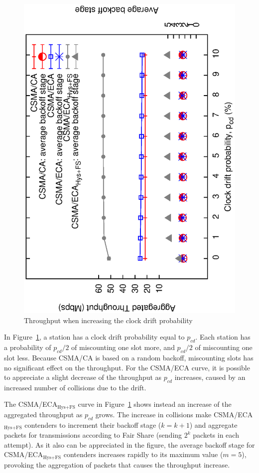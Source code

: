 \documentclass[a4paper,journal]{IEEEtran}
\begin{document}
	\begin{figure}[htbp]
	\centering
		\includegraphics[width=0.7\linewidth,angle=-90]{figures/clockDrift/throughput_and_BOS_w_SD.eps}
		\caption{Throughput when increasing the clock drift probability}
		\label{fig:clockDrift}
	\end{figure}
	
	In Figure~\ref{fig:clockDrift}, a station has a clock drift probability equal to $p_{cd}$. Each station has a probability of $p_{cd}/2$ of miscounting one slot more, and $p_{cd}/2$ of miscounting one slot less. Because CSMA/CA is based on a random backoff, miscounting slots has no significant effect on the throughput. For the CSMA/ECA curve, it is possible to appreciate a slight decrease of the throughput as $p_{cd}$ increases, caused by an increased number of collisions due to the drift.
	
	The CSMA/ECA$_{\text{Hys+FS}}$ curve in Figure~\ref{fig:clockDrift} shows instead an increase of the aggregated throughput as $p_{cd}$ grows. The increase in collisions make CSMA/ECA$_{\text{Hys+FS}}$ contenders to increment their backoff stage ($k=k+1$) and aggregate packets for transmissions according to Fair Share (sending $2^{k}$ packets in each attempt). As it also can be appreciated in the figure, the average backoff stage for CSMA/ECA$_{\text{Hys+FS}}$ contenders increases rapidly to its maximum value ($m=5$), provoking the aggregation of packets that causes the throughput increase.
	\\
\end{document}
